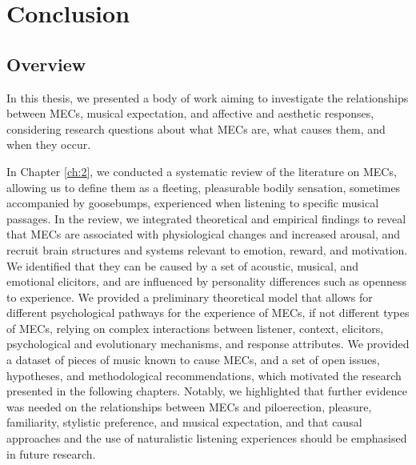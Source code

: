
\chapter{Conclusion}
\label{ch:6}

\section{Overview}

In this thesis, we presented a body of work aiming to investigate the relationships between MECs, musical expectation, and affective and aesthetic responses, considering research questions about what MECs are, what causes them, and when they occur.

In Chapter \ref{ch:2}, we conducted a systematic review of the literature on MECs, allowing us to define them as a fleeting, pleasurable bodily sensation, sometimes accompanied by goosebumps, experienced when listening to specific musical passages. In the review, we integrated theoretical and empirical findings to reveal that MECs are associated with physiological changes and increased arousal, and recruit brain structures and systems relevant to emotion, reward, and motivation. We identified that they can be caused by a set of acoustic, musical, and emotional elicitors, and are influenced by personality differences such as openness to experience. We provided a preliminary theoretical model that allows for different psychological pathways for the experience of MECs, if not different types of MECs, relying on complex interactions between listener, context, elicitors, psychological and evolutionary mechanisms, and response attributes. We provided a dataset of pieces of music known to cause MECs, and a set of open issues, hypotheses, and methodological recommendations, which motivated the research presented in the following chapters. Notably, we highlighted that further evidence was needed on the relationships between MECs and piloerection, pleasure, familiarity, stylistic preference, and musical expectation, and that causal approaches and the use of naturalistic listening experiences should be emphasised in future research.

